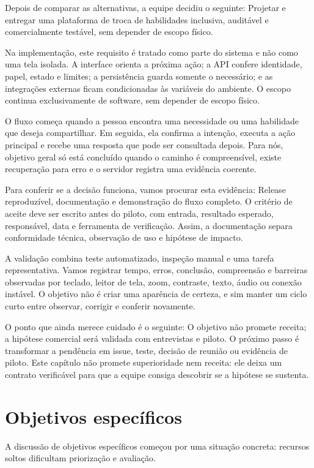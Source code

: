 \documentclass[12pt,oneside,a4paper,article]{abntex2}
\begin{document}
Depois de comparar as alternativas, a equipe decidiu o seguinte: Projetar e entregar uma plataforma de troca de habilidades inclusiva, auditável e comercialmente testável, sem depender de escopo físico.

Na implementação, este requisito é tratado como parte do sistema e não como uma tela isolada. A interface orienta a próxima ação; a API confere identidade, papel, estado e limites; a persistência guarda somente o necessário; e as integrações externas ficam condicionadas às variáveis do ambiente. O escopo continua exclusivamente de software, sem depender de escopo físico.

O fluxo começa quando a pessoa encontra uma necessidade ou uma habilidade que deseja compartilhar. Em seguida, ela confirma a intenção, executa a ação principal e recebe uma resposta que pode ser consultada depois. Para nós, objetivo geral só está concluído quando o caminho é compreensível, existe recuperação para erro e o servidor registra uma evidência coerente.

Para conferir se a decisão funciona, vamos procurar esta evidência: Release reproduzível, documentação e demonstração do fluxo completo. O critério de aceite deve ser escrito antes do piloto, com entrada, resultado esperado, responsável, data e ferramenta de verificação. Assim, a documentação separa conformidade técnica, observação de uso e hipótese de impacto.

A validação combina teste automatizado, inspeção manual e uma tarefa representativa. Vamos registrar tempo, erros, conclusão, compreensão e barreiras observadas por teclado, leitor de tela, zoom, contraste, texto, áudio ou conexão instável. O objetivo não é criar uma aparência de certeza, e sim manter um ciclo curto entre observar, corrigir e conferir novamente.

O ponto que ainda merece cuidado é o seguinte: O objetivo não promete receita; a hipótese comercial será validada com entrevistas e piloto. O próximo passo é transformar a pendência em issue, teste, decisão de reunião ou evidência de piloto. Este capítulo não promete superioridade nem receita: ele deixa um contrato verificável para que a equipe consiga descobrir se a hipótese se sustenta.

\section{Objetivos específicos}
A discussão de objetivos específicos começou por uma situação concreta: recursos soltos dificultam priorização e avaliação.
\end{document}
